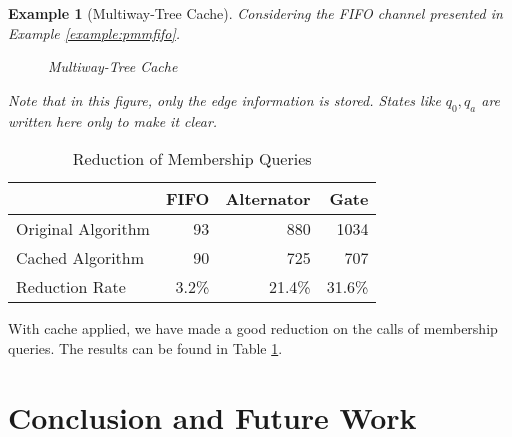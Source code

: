 \documentclass[conference, a4paper]{IEEEtran}
\newtheorem{example}{Example}
\begin{document}
\begin{example}[Multiway-Tree Cache]
  \label{example:tree}
  Considering the FIFO channel presented in Example \ref{example:pmmfifo}. 
  \begin{figure}[h]
    \begin{center}
      
    \end{center}
    \caption{Multiway-Tree Cache}
    \label{fig:multiway}
  \end{figure}
  Note that in this figure, only the edge information is stored. States like $q_0,q_a$ are written
  here only to make it clear.
\end{example}

\begin{table}[h]
  \renewcommand{\arraystretch}{1.3}
  \caption{Reduction of Membership Queries}
  \label{tabel:cacheoptimization}
  \centering
  \begin{tabular}{l||rrr}
    \hline
    & FIFO & Alternator & Gate \\
    \hline\hline
    Original Algorithm & 93 & 880 & 1034 \\
    Cached Algorithm & 90 & 725 & 707 \\
    Reduction Rate & 3.2\% & 21.4\% & 31.6\% \\
    \hline
  \end{tabular}
\end{table}

With cache applied, we have made a good reduction on the calls of membership queries. The results
can be found in Table \ref{tabel:cacheoptimization}.

\section{Conclusion and Future Work}






\listoftodos
\end{document}
